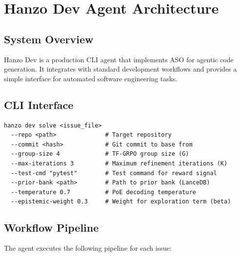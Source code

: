 \section{Hanzo Dev Agent Architecture}

\label{sec:agent}

\subsection{System Overview}

Hanzo Dev is a production CLI agent that implements ASO for agentic code
generation. It integrates with standard development workflows and provides a
simple interface for automated software engineering tasks.

\subsection{CLI Interface}

\begin{verbatim}
hanzo dev solve <issue_file>
  --repo <path>              # Target repository
  --commit <hash>            # Git commit to base from
  --group-size 4             # TF-GRPO group size (G)
  --max-iterations 3         # Maximum refinement iterations (K)
  --test-cmd "pytest"        # Test command for reward signal
  --prior-bank <path>        # Path to prior bank (LanceDB)
  --temperature 0.7          # PoE decoding temperature
  --epistemic-weight 0.3     # Weight for exploration term (beta)
\end{verbatim}

\subsection{Workflow Pipeline}

The agent executes the following pipeline for each issue:

